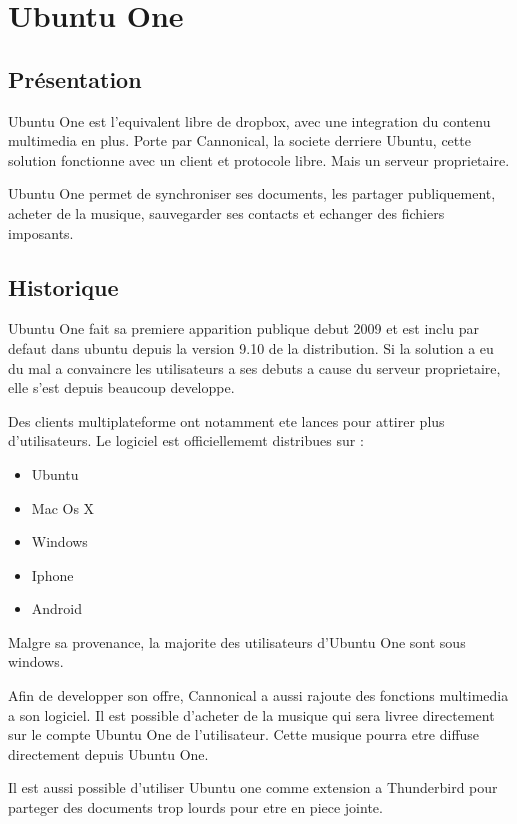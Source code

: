 \chapter{Ubuntu One}
\thispagestyle{EIP} %
\section{Présentation}
Ubuntu One est l'equivalent libre de dropbox, avec une integration du contenu multimedia en plus. Porte par Cannonical, la societe derriere Ubuntu, cette solution fonctionne avec un client et protocole libre. Mais un serveur proprietaire.

Ubuntu One permet de synchroniser ses documents, les partager publiquement, acheter de la musique, sauvegarder ses contacts et echanger des fichiers imposants.

\section{Historique}
Ubuntu One fait sa premiere apparition publique debut 2009 et est inclu par defaut dans ubuntu depuis la version 9.10 de la distribution. Si la solution a eu du mal a convaincre les utilisateurs a ses debuts a cause du serveur proprietaire, elle s'est depuis beaucoup developpe.

Des clients multiplateforme ont notamment ete lances pour attirer plus d'utilisateurs. Le logiciel est officiellememt distribues sur :

\begin{itemize}
\renewcommand{\labelitemi}{$\bullet$}
\item Ubuntu
\item Mac Os X
\item Windows
\item Iphone
\item Android
\end{itemize}

Malgre sa provenance, la majorite des utilisateurs d'Ubuntu One sont sous windows.

Afin de developper son offre, Cannonical a aussi rajoute des fonctions multimedia a son logiciel. Il est possible d'acheter de la musique qui sera livree directement sur le compte Ubuntu One de l'utilisateur. Cette musique pourra etre diffuse directement depuis Ubuntu One.

Il est aussi possible d'utiliser Ubuntu one comme extension a Thunderbird pour parteger des documents trop lourds pour etre en piece jointe.

